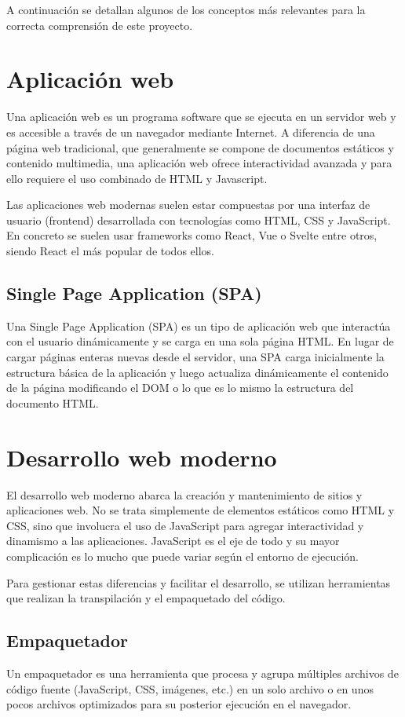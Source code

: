 A continuación se detallan algunos de los conceptos más relevantes para la correcta comprensión de este proyecto.

\section{Aplicación web}
Una aplicación web es un programa software que se ejecuta en un servidor web y es accesible a través de un navegador mediante Internet. A diferencia de una página web tradicional, que generalmente se compone de documentos estáticos y contenido multimedia, una aplicación web ofrece interactividad avanzada y para ello requiere el uso combinado de HTML y Javascript.

Las aplicaciones web modernas suelen estar compuestas por una interfaz de usuario (frontend) desarrollada con tecnologías como HTML, CSS y JavaScript. En concreto se suelen usar frameworks como React, Vue o Svelte entre otros, siendo React el más popular de todos ellos.

\subsection{Single Page Application (SPA)}
Una Single Page Application (SPA) es un tipo de aplicación web que interactúa con el usuario dinámicamente y se carga en una sola página HTML. En lugar de cargar páginas enteras nuevas desde el servidor, una SPA carga inicialmente la estructura básica de la aplicación y luego actualiza dinámicamente el contenido de la página modificando el DOM o lo que es lo mismo la estructura del documento HTML.


\section{Desarrollo web moderno}
El desarrollo web moderno abarca la creación y mantenimiento de sitios y aplicaciones web. No se trata simplemente de elementos estáticos como HTML y CSS, sino que involucra el uso de JavaScript para agregar interactividad y dinamismo a las aplicaciones. JavaScript es el eje de todo y su mayor complicación es lo mucho que puede variar según el entorno de ejecución.

Para gestionar estas diferencias y facilitar el desarrollo, se utilizan herramientas que realizan la transpilación y el empaquetado del código.

\subsection{Empaquetador}
Un empaquetador es una herramienta que procesa y agrupa múltiples archivos de código fuente (JavaScript, CSS, imágenes, etc.) en un solo archivo o en unos pocos archivos optimizados para su posterior ejecución en el navegador.

